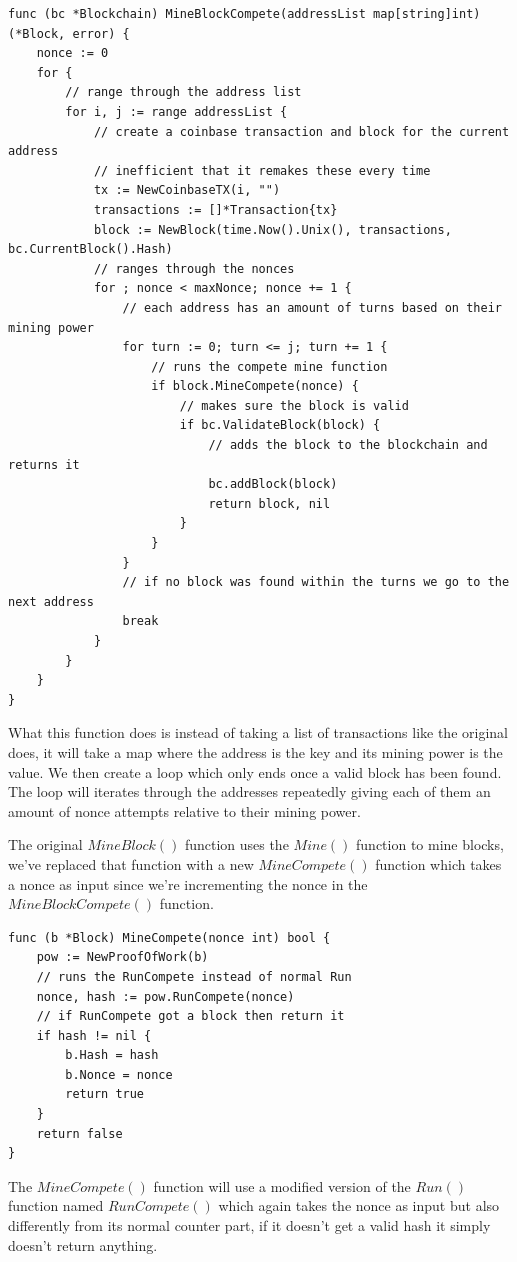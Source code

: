 \documentclass{article}
\begin{document}
\begin{lstlisting}[language=Golang, caption=MineBlockCompete, label={lis:mineblockcompete}]
func (bc *Blockchain) MineBlockCompete(addressList map[string]int) (*Block, error) {
	nonce := 0
	for {
		// range through the address list
		for i, j := range addressList {
			// create a coinbase transaction and block for the current address
			// inefficient that it remakes these every time
			tx := NewCoinbaseTX(i, "")
			transactions := []*Transaction{tx}
			block := NewBlock(time.Now().Unix(), transactions, bc.CurrentBlock().Hash)
			// ranges through the nonces
			for ; nonce < maxNonce; nonce += 1 {
				// each address has an amount of turns based on their mining power
				for turn := 0; turn <= j; turn += 1 {
					// runs the compete mine function
					if block.MineCompete(nonce) {
						// makes sure the block is valid
						if bc.ValidateBlock(block) {
							// adds the block to the blockchain and returns it
							bc.addBlock(block)
							return block, nil
						}
					}
				}
				// if no block was found within the turns we go to the next address
				break
			}
		}
	}
}
\end{lstlisting}

What this function does is instead of taking a list of transactions like the original does, it will take a map where the address is the key and its mining power is the value. We then create a loop which only ends once a valid block has been found. The loop will iterates through the addresses repeatedly giving each of them an amount of nonce attempts relative to their mining power.

The original $MineBlock()$ function uses the $Mine()$ function to mine blocks, we've replaced that function with a new $MineCompete()$ function which takes a nonce as input since we're incrementing the nonce in the $MineBlockCompete()$ function.

\begin{lstlisting}[language=Golang, caption=MineCompete, label={lis:minecompete}]
func (b *Block) MineCompete(nonce int) bool {
	pow := NewProofOfWork(b)
	// runs the RunCompete instead of normal Run
	nonce, hash := pow.RunCompete(nonce)
	// if RunCompete got a block then return it
	if hash != nil {
		b.Hash = hash
		b.Nonce = nonce
		return true
	}
	return false
}
\end{lstlisting}

The $MineCompete()$ function will use a modified version of the $Run()$ function named $RunCompete()$ which again takes the nonce as input but also differently from its normal counter part, if it doesn't get a valid hash it simply doesn't return anything. 
\end{document}
